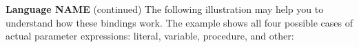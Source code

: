 \begin{minipage}[t]{\sw}
\slidenumber
\LARGE
{\bf Language NAME} (continued)\exx
The following illustration may help you to understand
how these bindings work.  The example shows all four
possible cases of actual parameter expressions:
literal, variable, procedure, and other:\exx
\centerline{}
\end{minipage}
